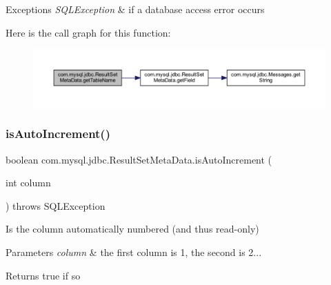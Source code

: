 \begin{DoxyExceptions}{Exceptions}
{\em S\+Q\+L\+Exception} & if a database access error occurs \\
\hline
\end{DoxyExceptions}
Here is the call graph for this function\+:
\nopagebreak
\begin{figure}[H]
\begin{center}
\leavevmode
\includegraphics[width=350pt]{classcom_1_1mysql_1_1jdbc_1_1_result_set_meta_data_a7b6a0a4f9aa6cc3901bfeb54c85fe888_cgraph}
\end{center}
\end{figure}
\mbox{\label{classcom_1_1mysql_1_1jdbc_1_1_result_set_meta_data_a41595c3fea85831fc2350ef5041bf489}} 
\subsubsection{\texorpdfstring{is\+Auto\+Increment()}{isAutoIncrement()}}
{\footnotesize\ttfamily boolean com.\+mysql.\+jdbc.\+Result\+Set\+Meta\+Data.\+is\+Auto\+Increment (\begin{DoxyParamCaption}\item[{int}]{column }\end{DoxyParamCaption}) throws S\+Q\+L\+Exception}

Is the column automatically numbered (and thus read-\/only)


\begin{DoxyParams}{Parameters}
{\em column} & the first column is 1, the second is 2...\\
\hline
\end{DoxyParams}
\begin{DoxyReturn}{Returns}
true if so
\end{DoxyReturn}

